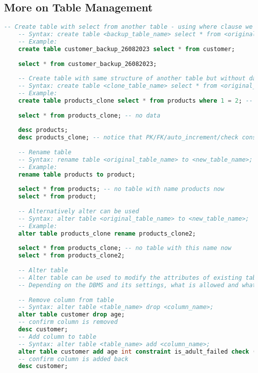 \subsection{More on Table Management}
\begin{lstlisting}[language=SQL]
	-- Create table with select from another table - using where clause we can only keep data that satisfy certain conditions
	-- Syntax: create table <backup_table_name> select * from <original_table_name>;
	-- Example:
	create table customer_backup_26082023 select * from customer;
	
	select * from customer_backup_26082023;
	
	-- Create table with same structure of another table but without data
	-- Syntax: create table <clone_table_name> select * from <original_table_name> where 1 = 2;
	-- Example:
	create table products_clone select * from products where 1 = 2; -- 1 = 2 will never be true and is used to insert no data
	
	select * from products_clone; -- no data
	
	desc products;
	desc products_clone; -- notice that PK/FK/auto_increment/check constraints etc are not copied on the new table, only the structure.
	
	-- Rename table
	-- Syntax: rename table <original_table_name> to <new_table_name>;
	-- Example:
	rename table products to product;
	
	select * from products; -- no table with name products now
	select * from product;
	
	-- Alternatively alter can be used
	-- Syntax: alter table <original_table_name> to <new_table_name>;
	-- Example:
	alter table products_clone rename products_clone2;
	
	select * from products_clone; -- no table with this name now
	select * from products_clone2;
	
	-- Alter table
	-- Alter table can be used to modify the attributes of existing tables, viewe or any database object
	-- Depending on the DBMS and its settings, what is allowed and what is not allowed to alter might slightly differ
	
	-- Remove column from table
	-- Syntax: alter table <table_name> drop <column_name>;
	alter table customer drop age;
	-- confirm column is removed
	desc customer;
	-- Add column to table
	-- Syntax: alter table <table_name> add <column_name>;
	alter table customer add age int constraint is_adult_failed check (age > 18);
	-- confirm column is added back
	desc customer;
	

\end{lstlisting}
